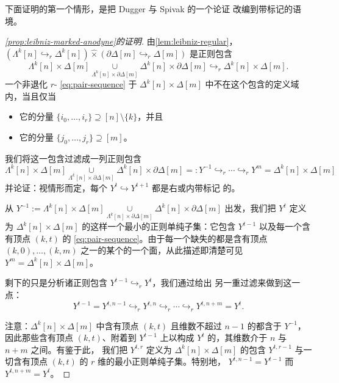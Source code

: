 下面证明的第一个情形，是把 Dugger 与 Spivak 的一个论证 \cite[A.1]{bib36}
改编到带标记的语境。

\begin{proof}[\cref{prop:leibniz-marked-anodyne}的证明]
由\cref{lem:leibniz-regular}，\trLeibnizProduct{}
$(\Lambda^{k}[n]\hookrightarrow_{r}\Delta^{k}[n])\mathbin{\widehat{\times}}(\partial\Delta[m]\hookrightarrow_{r}\Delta[m])$ 是正则包含
\[ \Lambda^{k}[n]\times\Delta[m]
   \underset{\Lambda^{k}[n]\times\partial\Delta[m]}{\cup}
   \Delta^{k}[n]\times\partial\Delta[m]
   \hookrightarrow_{r}\Delta^{k}[n]\times\Delta[m]\mbox{.} \]
一个非退化 $r$-\trSimplex{} \eqref{eq:pair-sequence} 于
$\Delta^{k}[n]\times\Delta[m]$ 中不在这个\trLeibnizProduct{}包含的定义域内，当且仅当%
\begin{itemize}
\item 它的分量 $\{i_{0},\dots,i_{r}\}\supseteq[n]\setminus\{k\}$，并且
\item 它的分量 $\{j_{0},\dots,j_{r}\}\supseteq[m]$。
\end{itemize}
我们将这一包含过滤成一列正则包含
\[ \Lambda^{k}[n]\times\Delta[m]
   \underset{\Lambda^{k}[n]\times\partial\Delta[m]}{\cup}
   \Delta^{k}[n]\times\partial\Delta[m]=:Y^{-1}
   \hookrightarrow_{r}\cdots\hookrightarrow_{r}Y^{m}
   =\Delta^{k}[n]\times\Delta[m] \]
并论证：视情形而定，每个 $Y^{t}\hookrightarrow Y^{t+1}$ 都是右或内带标记%
\trAnodyne{}的。

从 $Y^{-1}:=\Lambda^{k}[n]\times\Delta[m]\underset{\Lambda^{k}[n]\times\partial\Delta[m]}{\cup}\Delta^{k}[n]\times\partial\Delta[m]$ 出发，我们把 $Y^{t}$ 定义为
$\Delta^{k}[n]\times\Delta[m]$ 的这样一个最小的正则单纯子集：它包含
$Y^{t-1}$ 以及每一个含有顶点 $(k,t)$ 的\trSimplex{}
\eqref{eq:pair-sequence}。由于每一个缺失的\trSimplex{}都是含有顶点
$(k,0),\dots,(k,m)$ 之一的某个\trSimplex{}的一个面，从此描述即清楚可见
$Y^{m}=\Delta^{k}[n]\times\Delta[m]$。

剩下的只是分析诸正则包含 $Y^{t-1}\hookrightarrow_{r}Y^{t}$，我们通过给出
另一重过滤来做到这一点：
\[ Y^{t-1}=Y^{t,n-1}\hookrightarrow_{r}Y^{t,n}\hookrightarrow_{r}
   \cdots\hookrightarrow_{r}Y^{t,n+m}=Y^{t}\mbox{.} \]

注意：$\Delta^{k}[n]\times\Delta[m]$ 中含有顶点 $(k,t)$ 且维数不超过 $n-1$
的\trSimplex{}都含于 $Y^{-1}$，因此那些含有顶点 $(k,t)$、附着到 $Y^{t-1}$
上以构成 $Y^{t}$ 的\trSimplex{}，其维数介于 $n$ 与 $n+m$ 之间。有鉴于此，
我们把 $Y^{t,r}$ 定义为 $\Delta^{k}[n]\times\Delta[m]$ 的包含 $Y^{t,r-1}$
与一切含有顶点 $(k,t)$ 的 $r$ 维\trSimplex{}的最小正则单纯子集。特别地，
$Y^{t,n-1}=Y^{t-1}$ 而 $Y^{t,n+m}=Y^{t}$。


\end{proof}
